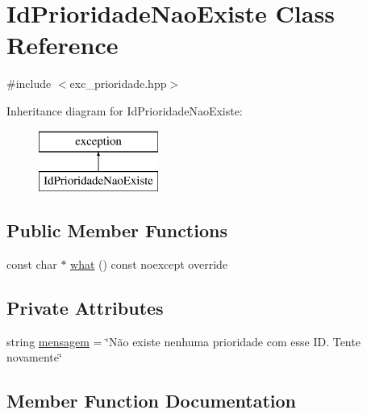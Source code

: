 \hypertarget{classIdPrioridadeNaoExiste}{}\section{Id\+Prioridade\+Nao\+Existe Class Reference}
\label{classIdPrioridadeNaoExiste}


{\ttfamily \#include $<$exc\+\_\+prioridade.\+hpp$>$}

Inheritance diagram for Id\+Prioridade\+Nao\+Existe\+:\begin{figure}[H]
\begin{center}
\leavevmode
\includegraphics[height=2.000000cm]{classIdPrioridadeNaoExiste}
\end{center}
\end{figure}
\subsection*{Public Member Functions}
\begin{DoxyCompactItemize}
\item 
const char $\ast$ \hyperlink{classIdPrioridadeNaoExiste_a9e04482f29c7ed2c98fe3a388c6781d1}{what} () const noexcept override
\end{DoxyCompactItemize}
\subsection*{Private Attributes}
\begin{DoxyCompactItemize}
\item 
string \hyperlink{classIdPrioridadeNaoExiste_a0dc8383d0ca6ae78bf02a7429604bf63}{mensagem} = \char`\"{}Não existe nenhuma prioridade com esse I\+D. Tente novamente\char`\"{}
\end{DoxyCompactItemize}


\subsection{Member Function Documentation}
\mbox{\label{classIdPrioridadeNaoExiste_a9e04482f29c7ed2c98fe3a388c6781d1}} 
